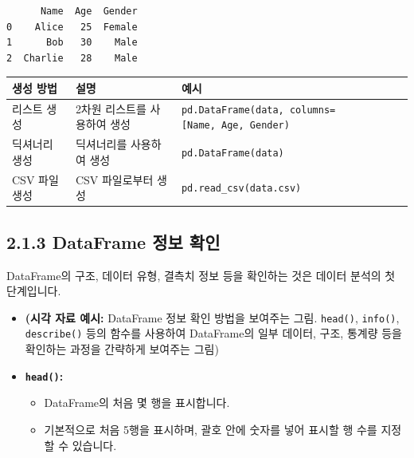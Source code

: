 \documentclass[
  letterpaper,
]{book}
\providecommand{\tightlist}{%
  \setlength{\itemsep}{0pt}\setlength{\parskip}{0pt}}
\begin{document}
\begin{verbatim}
      Name  Age  Gender
0    Alice   25  Female
1      Bob   30    Male
2  Charlie   28    Male
\end{verbatim}

\begin{longtable}[]{@{}
  >{\centering\arraybackslash}p{}
  >{\centering\arraybackslash}p{}
  >{\centering\arraybackslash}p{}@{}}
\toprule\noalign{}
\begin{minipage}[b]{\linewidth}\centering
생성 방법
\end{minipage} & \begin{minipage}[b]{\linewidth}\centering
설명
\end{minipage} & \begin{minipage}[b]{\linewidth}\centering
예시
\end{minipage} \\
\midrule\noalign{}
\endhead
\bottomrule\noalign{}
\endlastfoot
리스트 생성 & 2차원 리스트를 사용하여 생성 &
\texttt{pd.DataFrame(data,\ columns={[}\textquotesingle{}Name\textquotesingle{},\ \textquotesingle{}Age\textquotesingle{},\ \textquotesingle{}Gender\textquotesingle{}{]})} \\
딕셔너리 생성 & 딕셔너리를 사용하여 생성 &
\texttt{pd.DataFrame(data)} \\
CSV 파일 생성 & CSV 파일로부터 생성 &
\texttt{pd.read\_csv(\textquotesingle{}data.csv\textquotesingle{})} \\
\end{longtable}

\subsection{2.1.3 DataFrame 정보
확인}\label{dataframe-uxc815uxbcf4-uxd655uxc778}

DataFrame의 구조, 데이터 유형, 결측치 정보 등을 확인하는 것은 데이터
분석의 첫 단계입니다.

\begin{itemize}
\item
  \textbf{(시각 자료 예시:} DataFrame 정보 확인 방법을 보여주는 그림.
  \texttt{head()}, \texttt{info()}, \texttt{describe()} 등의 함수를
  사용하여 DataFrame의 일부 데이터, 구조, 통계량 등을 확인하는 과정을
  간략하게 보여주는 그림)
\item
  \textbf{\texttt{head()}:}

  \begin{itemize}
  \tightlist
  \item
    DataFrame의 처음 몇 행을 표시합니다.
  \item
    기본적으로 처음 5행을 표시하며, 괄호 안에 숫자를 넣어 표시할 행 수를
    지정할 수 있습니다.
  \end{itemize}
\end{itemize}
\end{document}
